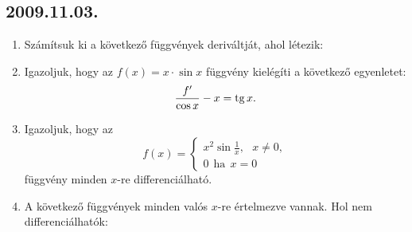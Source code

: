 \subsection*{2009.11.03.}
\begin{enumerate}
\item Számítsuk ki a következő függvények deriváltját, ahol létezik:
\item Igazoljuk, hogy az $f(x)=x\cdot \sin x$ függvény kielégíti a következő egyenletet:
	\[ \frac{f'}{\cos x}-x=\mathop{\mathrm{tg}}\nolimits x. \]
\item Igazoljuk, hogy az 
	\[  f(x) = 
	  \begin{cases} 
	   x^2 \sin \frac{1}{x},~~~x\neq 0, \\
	   0~~\text{ha}~~x =0
	  \end{cases} \]
	  függvény minden $x$-re differenciálható.
\item A következő függvények minden valós $x$-re értelmezve vannak. Hol nem 					differenciálhatók:
\end{enumerate}

